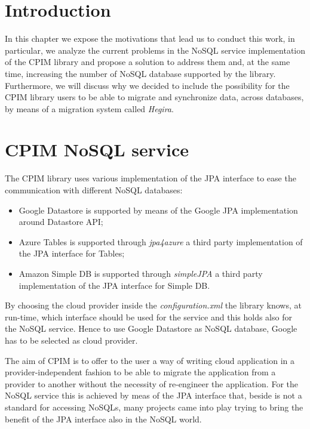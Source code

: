\section{Introduction}
In this chapter we expose the motivations that lead us to conduct this work, in particular, we analyze the current problems in the NoSQL service implementation of the CPIM library and propose a solution to address them and, at the same time, increasing the number of NoSQL database supported by the library.
\noindent Furthermore, we will discuss why we decided to include the possibility for the CPIM library users to be able to migrate and synchronize data, across databases, by means of a migration system called \textit{Hegira}.

\section{CPIM NoSQL service}
The CPIM library uses various implementation of the JPA interface to ease the communication with different NoSQL databases:
\begin{itemize}
\item Google Datastore is supported by means of the Google JPA implementation around Datastore API;
\item Azure Tables is supported through \textit{jpa4azure} a third party implementation of the JPA interface for Tables;
\item Amazon Simple DB is supported through \textit{simpleJPA} a third party implementation of the JPA interface for Simple DB.
\end{itemize}
\noindent By choosing the cloud provider inside the \textit{configuration.xml} the library knows, at run-time, which interface should be used for the service and this holds also for the NoSQL service. Hence to use Google Datastore as NoSQL database, Google has to be selected as cloud provider.

\noindent The aim of CPIM is to offer to the user a way of writing cloud application in a provider-independent fashion to be able to migrate the application from a provider to another without the necessity of re-engineer the application. For the NoSQL service this is achieved by meas of the JPA interface that, beside is not a standard for accessing NoSQLs, many projects came into play trying to bring the benefit of the JPA interface also in the NoSQL world.

